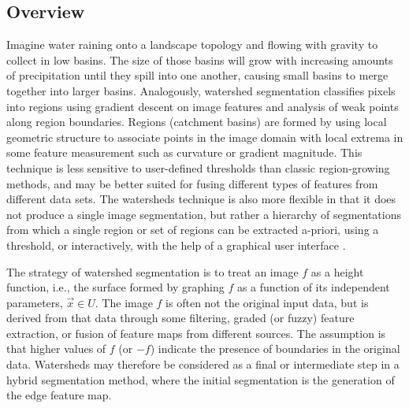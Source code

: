 %
%
%
%

\subsection{Overview}
\label{sec:AboutWatersheds}

Imagine water raining onto a landscape topology and flowing with gravity to
collect in low basins.  The size of those basins will grow with increasing
amounts of precipitation until they spill into one another, causing small
basins to merge together into larger basins.  Analogously, watershed
segmentation classifies pixels into regions using gradient descent on image
features and analysis of weak points along region boundaries. Regions
(catchment basins) are formed by using local geometric structure to associate
points in the image domain with local extrema in some feature measurement such
as curvature or gradient magnitude.  This technique is less sensitive to
user-defined thresholds than classic region-growing methods, and may be better
suited for fusing different types of features from different data sets.  The
watersheds technique is also more flexible in that it does not produce a single
image segmentation, but rather a hierarchy of segmentations from which a
single region or set of regions can be extracted a-priori, using a threshold,
or interactively, with the help of a graphical user interface
\cite{Yoo1992,Yoo1991}.

The strategy of watershed segmentation is to treat an image $f$ as a height
function, i.e.,  the surface formed by graphing $f$ as a function of its
independent parameters, $\vec{x} \in U$.  The image $f$ is often not the
original input data, but is derived from that data through some filtering,
graded (or fuzzy) feature extraction, or fusion of feature maps from different
sources.  The assumption is that higher values of $f$ (or $-f$) indicate the
presence of boundaries in the original data.  Watersheds may therefore be
considered as a final or intermediate step in a hybrid segmentation method,
where the initial segmentation is the generation of the edge feature map.

